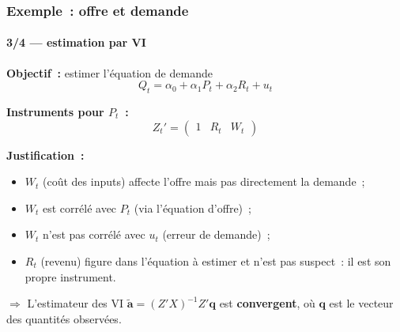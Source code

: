 \documentclass[10pt]{beamer}
\begin{document}
\begin{frame}
  \frametitle{Exemple~: offre et demande}
  \framesubtitle{3/4 --- estimation par VI}

  \textbf{Objectif~:} estimer l'équation de demande
  \[ Q_t = \alpha_0 + \alpha_1 P_t + \alpha_2 R_t + u_t \]

  \textbf{Instruments pour $P_t$~:}
  \[ Z_t' = \begin{pmatrix} 1 & R_t & W_t \end{pmatrix} \]

  \medskip

  \textbf{Justification~:}
  \begin{itemize}
  \item $W_t$ (coût des inputs) affecte l'offre mais pas directement la demande~;
  \item $W_t$ est corrélé avec $P_t$ (via l'équation d'offre)~;
  \item $W_t$ n'est pas corrélé avec $u_t$ (erreur de demande)~;
  \item $R_t$ (revenu) figure dans l'équation à estimer et n'est pas suspect~:
    il est son propre instrument.
  \end{itemize}

  \medskip

  $\Rightarrow$ L'estimateur des VI
  $\tilde{\mathbf a} = (Z'X)^{-1}Z'\mathbf q$ est \textbf{convergent}, où
  $\mathbf q$ est le vecteur des quantités observées.

\end{frame}
\end{document}
